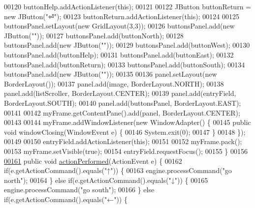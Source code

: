 \begin{DoxyCode}
00120         buttonHelp.addActionListener(\textcolor{keyword}{this});
00121 
00122         JButton buttonReturn = \textcolor{keyword}{new} JButton(\textcolor{stringliteral}{"⏎"});
00123         buttonReturn.addActionListener(\textcolor{keyword}{this});
00124 
00125         buttonsPanel.setLayout(\textcolor{keyword}{new} GridLayout(3,3));
00126         buttonsPanel.add(\textcolor{keyword}{new} JButton(\textcolor{stringliteral}{""}));
00127         buttonsPanel.add(buttonNorth);
00128         buttonsPanel.add(\textcolor{keyword}{new} JButton(\textcolor{stringliteral}{""}));
00129         buttonsPanel.add(buttonWest);
00130         buttonsPanel.add(buttonHelp);
00131         buttonsPanel.add(buttonEast);
00132         buttonsPanel.add(buttonReturn);
00133         buttonsPanel.add(buttonSouth);
00134         buttonsPanel.add(\textcolor{keyword}{new} JButton(\textcolor{stringliteral}{""}));
00135 
00136         panel.setLayout(\textcolor{keyword}{new} BorderLayout());
00137         panel.add(image, BorderLayout.NORTH);
00138         panel.add(listScroller, BorderLayout.CENTER);
00139         panel.add(entryField, BorderLayout.SOUTH);
00140         panel.add(buttonsPanel, BorderLayout.EAST);
00141 
00142         myFrame.getContentPane().add(panel, BorderLayout.CENTER);
00143 
00144         myFrame.addWindowListener(\textcolor{keyword}{new} WindowAdapter() \{
00145             \textcolor{keyword}{public} \textcolor{keywordtype}{void} windowClosing(WindowEvent e) \{
00146                 System.exit(0);
00147             \}
00148         \});
00149 
00150         entryField.addActionListener(\textcolor{keyword}{this});
00151 
00152         myFrame.pack();
00153         myFrame.setVisible(\textcolor{keyword}{true});
00154         entryField.requestFocus();
00155     \}
00156 
\hypertarget{UserInterface_8java_source_l00161}{}\hyperlink{classUserInterface_a0a1ee40a4dbca4aeee002c3d0537c7d5}{00161}     \textcolor{keyword}{public} \textcolor{keywordtype}{void} \hyperlink{classUserInterface_a0a1ee40a4dbca4aeee002c3d0537c7d5}{actionPerformed}(ActionEvent e) \{
00162         \textcolor{keywordflow}{if}(e.getActionCommand().equals(\textcolor{stringliteral}{"↑"})) \{
00163             engine.processCommand(\textcolor{stringliteral}{"go north"});
00164         \} \textcolor{keywordflow}{else} \textcolor{keywordflow}{if}(e.getActionCommand().equals(\textcolor{stringliteral}{"↓"})) \{
00165             engine.processCommand(\textcolor{stringliteral}{"go south"});
00166         \} \textcolor{keywordflow}{else} \textcolor{keywordflow}{if}(e.getActionCommand().equals(\textcolor{stringliteral}{"←"})) \{

\end{DoxyCode}
